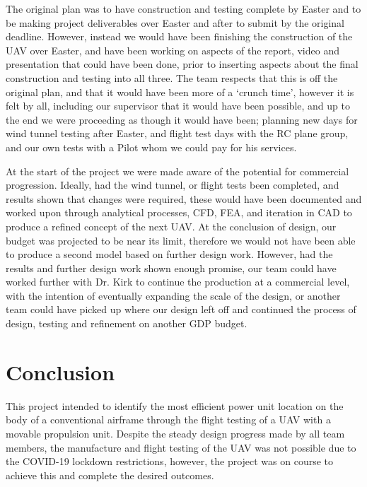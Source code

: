 \documentclass[../../main.tex]{subfiles}
\begin{document}

The original plan was to have construction and testing complete by Easter and to be making project deliverables over Easter and after to submit by the original deadline.
However, instead we would have been finishing the construction of the UAV over Easter, and have been working on aspects of the report, video and presentation that could have been done, prior to inserting aspects about the final construction and testing into all three.
The team respects that this is off the original plan, and that it would have been more of a ‘crunch time’, however it is felt by all, including our supervisor that it would have been possible, and up to the end we were proceeding as though it would have been; planning new days for wind tunnel testing after Easter, and flight test days with the RC plane group, and our own tests with a Pilot whom we could pay for his services.  

At the start of the project we were made aware of the potential for commercial progression.
Ideally, had the wind tunnel, or flight tests been completed, and results shown that changes were required, these would have been documented and worked upon through analytical processes, CFD, FEA, and iteration in CAD to produce a refined concept of the next UAV.
At the conclusion of design, our budget was projected to be near its limit, therefore we would not have been able to produce a second model based on further design work.
However, had the results and further design work shown enough promise, our team could have worked further with Dr. Kirk to continue the production at a commercial level, with the intention of eventually expanding the scale of the design, or another team could have picked up where our design left off and continued the process of design, testing and refinement on another GDP budget. 

\section{Conclusion} \label{sec:project-review:conclusion}

This project intended to identify the most efficient power unit location on the body of a conventional airframe through the flight testing of a UAV with a movable propulsion unit.
Despite the steady design progress made by all team members, the manufacture and flight testing of the UAV was not possible due to the COVID-19 lockdown restrictions, however, the project was on course to achieve this and complete the desired outcomes.  
\end{document}
